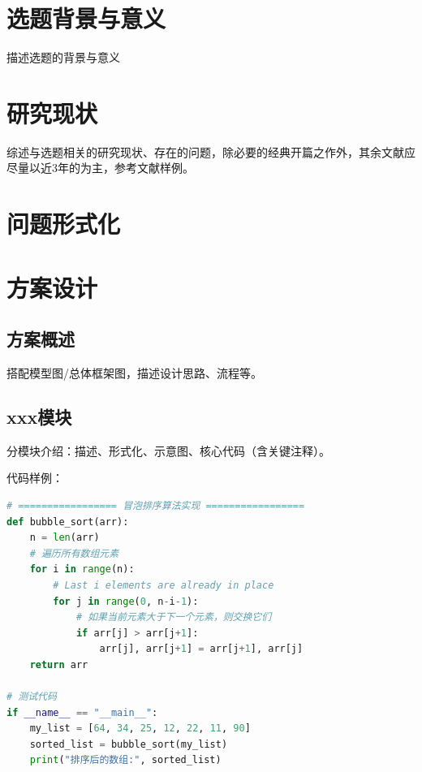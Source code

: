 \documentclass{style/course-report}
\begin{document}
\makecover


\section{选题背景与意义}

描述选题的背景与意义

\section{研究现状}

综述与选题相关的研究现状、存在的问题，除必要的经典开篇之作外，其余文献应尽量以近3年的为主，参考文献样例\cite{Bengio2013,Candes2011,Locatello2019,JTBH202106001,Chen2025IoVCrowdsensing,Higgins2017,Kolda2009,Vapnik1998,Zhang2025Auction}。

\section{问题形式化}

\section{方案设计}

\subsection{方案概述}
搭配模型图/总体框架图，描述设计思路、流程等。


\subsection{xxx模块}
分模块介绍：描述、形式化、示意图、核心代码（含关键注释）。

代码样例：

\begin{lstlisting}[language=Python]
# ================= 冒泡排序算法实现 =================
def bubble_sort(arr):
    n = len(arr)
    # 遍历所有数组元素
    for i in range(n):
        # Last i elements are already in place
        for j in range(0, n-i-1):
            # 如果当前元素大于下一个元素，则交换它们
            if arr[j] > arr[j+1]:
                arr[j], arr[j+1] = arr[j+1], arr[j]
    return arr

# 测试代码
if __name__ == "__main__":
    my_list = [64, 34, 25, 12, 22, 11, 90]
    sorted_list = bubble_sort(my_list)
    print("排序后的数组:", sorted_list)
\end{lstlisting}
\end{document}
